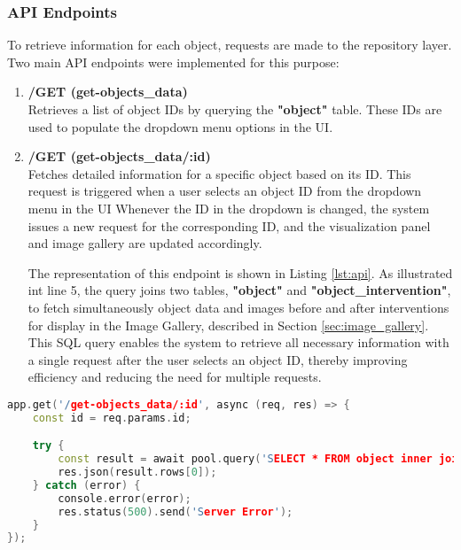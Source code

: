 \subsubsection{API Endpoints}

To retrieve information for each object, requests are made to the repository layer. 
Two main API endpoints were implemented for this purpose:

\begin{enumerate}
  \item \textbf{/GET (get-objects\_data)}
  \\Retrieves a list of object IDs by querying the \textbf{"object"} table. These IDs are used to populate the dropdown menu options in the \gls{UI}.

  \item \textbf{/GET (get-objects\_data/:id)}
  \\Fetches detailed information for a specific object based on its ID. This request is triggered when a user selects an object ID from the dropdown menu in the \gls{UI}
  Whenever the ID in the dropdown is changed, the system issues a new request for the corresponding ID, and the visualization panel and image gallery are updated accordingly.

  The representation of this endpoint is shown in Listing \ref{lst:api}. As illustrated int line 5, the query joins two tables, \textbf{"object"} and \textbf{"object\_intervention"}, to fetch simultaneously object data and images before and after interventions for display in the Image Gallery, described in Section \ref{sec:image_gallery}. 
  This SQL query enables the system to retrieve all necessary information with a single request after the user selects an object ID, thereby improving efficiency and reducing the need for multiple requests.

\end{enumerate}

\begin{lstlisting}[language=C++, caption={Example of defining an API endpoint in Node.js.},label={lst:api}]
  app.get('/get-objects_data/:id', async (req, res) => {
    const id = req.params.id;

    try {
        const result = await pool.query('SELECT * FROM object inner join object_intervention on object.id = object_intervention.object_id WHERE object.id = $1', [id]);
        res.json(result.rows[0]);
    } catch (error) {
        console.error(error);
        res.status(500).send('Server Error');
    }
});
\end{lstlisting}


